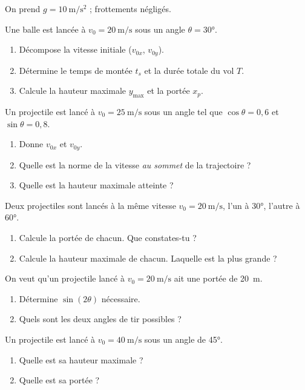 \documentclass[11pt,a4paper]{article}
\begin{document}
On prend $g=\qty{10}{\metre\per\second\squared}$ ; frottements négligés.

\begin{exo}
Une balle est lancée à $v_0=\qty{20}{\metre\per\second}$ sous un angle $\theta=\ang{30}$.
\begin{enumerate}[label=\alph*)]
  \item Décompose la vitesse initiale ($v_{0x}$, $v_{0y}$).
  \item Détermine le temps de montée $t_s$ et la durée totale du vol $T$.
  \item Calcule la hauteur maximale $y_{\max}$ et la portée $x_p$.
\end{enumerate}
\end{exo}

\begin{exo}
Un projectile est lancé à $v_0=\qty{25}{\metre\per\second}$ sous un angle tel que $\cos\theta=0{,}6$ et $\sin\theta=0{,}8$.
\begin{enumerate}[label=\alph*)]
  \item Donne $v_{0x}$ et $v_{0y}$.
  \item Quelle est la norme de la vitesse \emph{au sommet} de la trajectoire ?
  \item Quelle est la hauteur maximale atteinte ?
\end{enumerate}
\end{exo}

\begin{exo}
Deux projectiles sont lancés à la même vitesse $v_0=\qty{20}{\metre\per\second}$, l'un à \ang{30}, l'autre à \ang{60}.
\begin{enumerate}[label=\alph*)]
  \item Calcule la portée de chacun. Que constates-tu ?
  \item Calcule la hauteur maximale de chacun. Laquelle est la plus grande ?
\end{enumerate}
\end{exo}

\begin{exo}
On veut qu'un projectile lancé à $v_0=\qty{20}{\metre\per\second}$ ait une portée de \qty{20}{\metre}.
\begin{enumerate}[label=\alph*)]
  \item Détermine $\sin(2\theta)$ nécessaire.
  \item Quels sont les deux angles de tir possibles ?
\end{enumerate}
\end{exo}

\begin{exo}
Un projectile est lancé à $v_0=\qty{40}{\metre\per\second}$ sous un angle de \ang{45}.
\begin{enumerate}[label=\alph*)]
  \item Quelle est sa hauteur maximale ?
  \item Quelle est sa portée ?
\end{enumerate}
\end{exo}
\end{document}
